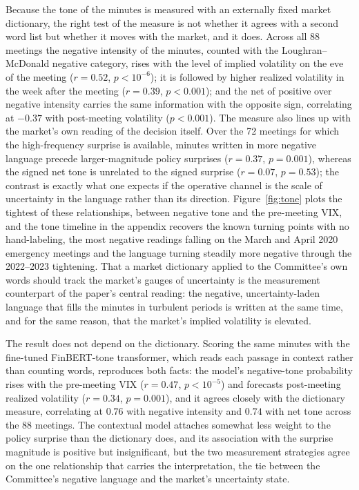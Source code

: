 \documentclass[11pt,a4paper]{article}
\begin{document}
Because the tone of the minutes is measured with an externally fixed market
dictionary, the right test of the measure is not whether it agrees with a second
word list but whether it moves with the market, and it does. Across all 88 meetings
the negative intensity of the minutes, counted with the Loughran--McDonald negative
category, rises with the level of implied volatility on the eve of the meeting
($r=0.52$, $p<10^{-6}$); it is followed by higher realized volatility in the week
after the meeting ($r=0.39$, $p<0.001$); and the net of positive over negative
intensity carries the same information with the opposite sign, correlating at
$-0.37$ with post-meeting volatility ($p<0.001$). The measure also lines up with the
market's own reading of the decision itself. Over the 72 meetings for which the
high-frequency surprise is available, minutes written in more negative language
precede larger-magnitude policy surprises ($r=0.37$, $p=0.001$), whereas the signed
net tone is unrelated to the signed surprise ($r=0.07$, $p=0.53$); the contrast is
exactly what one expects if the operative channel is the scale of uncertainty in
the language rather than its direction. Figure~\ref{fig:tone} plots the tightest of
these relationships, between negative tone and the pre-meeting VIX, and the tone
timeline in the appendix recovers the known turning points with no hand-labeling,
the most negative readings falling on the March and April 2020 emergency meetings
and the language turning steadily more negative through the 2022--2023 tightening.
That a market dictionary applied to the Committee's own words should track the
market's gauges of uncertainty is the measurement counterpart of the paper's
central reading: the negative, uncertainty-laden language that fills the minutes in
turbulent periods is written at the same time, and for the same reason, that the
market's implied volatility is elevated.

The result does not depend on the dictionary. Scoring the same minutes with the
fine-tuned FinBERT-tone transformer, which reads each passage in context rather than
counting words, reproduces both facts: the model's negative-tone probability rises
with the pre-meeting VIX ($r=0.47$, $p<10^{-5}$) and forecasts post-meeting realized
volatility ($r=0.34$, $p=0.001$), and it agrees closely with the dictionary measure,
correlating at $0.76$ with negative intensity and $0.74$ with net tone across the 88
meetings. The contextual model attaches somewhat less weight to the policy surprise
than the dictionary does, and its association with the surprise magnitude is
positive but insignificant, but the two measurement strategies agree on the one
relationship that carries the interpretation, the tie between the Committee's
negative language and the market's uncertainty state.
\end{document}
